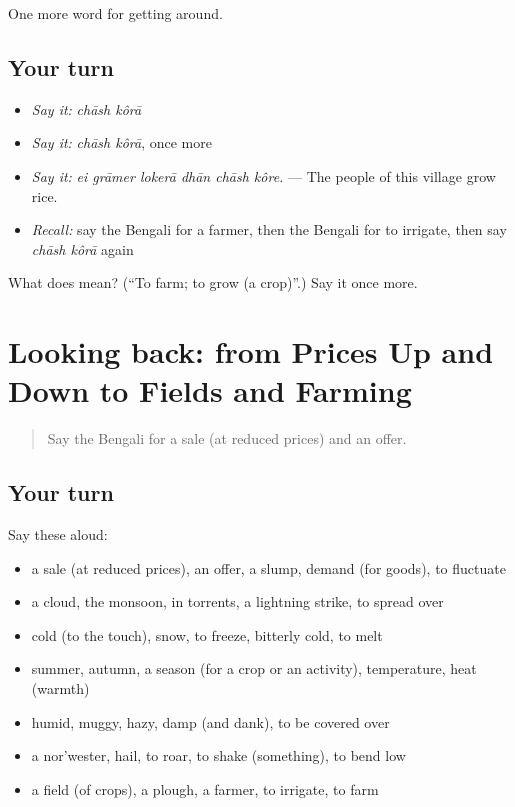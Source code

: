 \begin{grammarlens}[title={What you've built}]
One more word for getting around.
\end{grammarlens}

\subsection*{Your turn}
\begin{itemize}
\raggedright
  \item \emph{Say it:} \emph{chāsh kôrā}
  \item \emph{Say it:} \emph{chāsh kôrā}, once more
  \item \emph{Say it:} \emph{ei grāmer lokerā dhān chāsh kôre.} — The people of this village grow rice.
  \item \emph{Recall:} say the Bengali for a farmer, then the Bengali for to irrigate, then say \emph{chāsh kôrā} again
\end{itemize}

\begin{tcolorbox}[breakable,colback=teal!4,colframe=teal!35!black,title={Before you move on}]
What does   mean? (\textquotedblleft{}To farm; to grow (a crop)\textquotedblright{}.) Say it once more.
\end{tcolorbox}
\section[(dialogue)]{Looking back: from Prices Up and Down to Fields and Farming}

\label{lesson:BN-R430-review-424-430}



\begin{quote}
Say the Bengali for a sale (at reduced prices) and an offer.
\end{quote}

\subsection*{Your turn}
Say these aloud:

\begin{itemize}
\raggedright
  \item a sale (at reduced prices), an offer, a slump, demand (for goods), to fluctuate
  \item a cloud, the monsoon, in torrents, a lightning strike, to spread over
  \item cold (to the touch), snow, to freeze, bitterly cold, to melt
  \item summer, autumn, a season (for a crop or an activity), temperature, heat (warmth)
  \item humid, muggy, hazy, damp (and dank), to be covered over
  \item a nor'wester, hail, to roar, to shake (something), to bend low
  \item a field (of crops), a plough, a farmer, to irrigate, to farm
\end{itemize}

